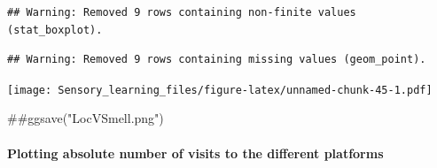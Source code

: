 \documentclass[]{article}
\newenvironment{Shaded}{\begin{snugshade}}{\end{snugshade}}
\newcommand{\NormalTok}[1]{{#1}}
\let\oldparagraph\paragraph
\renewcommand{\paragraph}[1]{\oldparagraph{#1}\mbox{}}
\begin{document}
\begin{verbatim}
## Warning: Removed 9 rows containing non-finite values (stat_boxplot).
\end{verbatim}

\begin{verbatim}
## Warning: Removed 9 rows containing missing values (geom_point).
\end{verbatim}

\texttt{[image: Sensory\_learning\_files/figure-latex/unnamed-chunk-45-1.pdf]}

\begin{Shaded}
\begin{Highlighting}[]
\NormalTok{##ggsave("LocVSmell.png")}
\end{Highlighting}
\end{Shaded}

\paragraph{Plotting absolute number of visits to the different
platforms}\label{plotting-absolute-number-of-visits-to-the-different-platforms-1}
\end{document}
